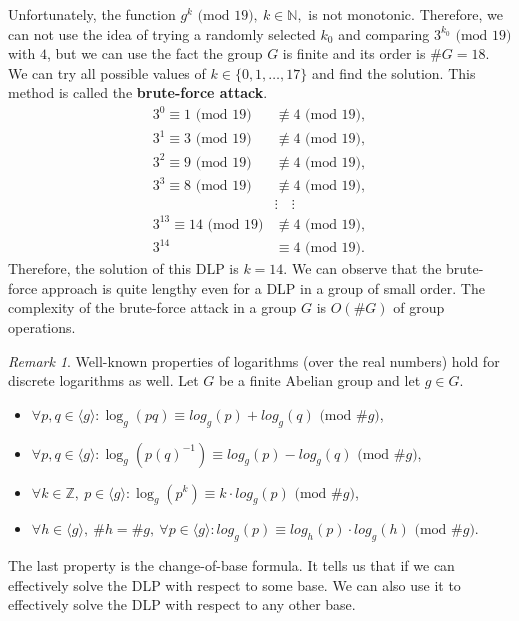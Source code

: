 \documentclass[thesis=M,english]{FITthesis}[2012/10/20]
\theoremstyle{remark}
\newtheorem*{RM}{Remark}
\theoremstyle{definition}
\begin{document}
\noindent Unfortunately, the function $g^k \text{ (mod 19)},\ k \in \mathbb{N},$ is not monotonic. Therefore, we can not use the idea of trying a randomly selected $k_0$ and comparing $3^{k_0} \text{ (mod 19)}$ with $4$, but we can use the fact the group $G$ is finite and its order is $\#G = 18$. We can try all possible values of $k \in \{0, 1, \ldots, 17\}$ and find the solution. This method is called the \textbf{brute-force attack}. 
\begin{align*}
3^0 \equiv 1 \text{ (mod 19)} &\not\equiv 4 \text{ (mod 19)}, \\
3^1 \equiv 3 \text{ (mod 19)} &\not\equiv 4 \text{ (mod 19)}, \\
3^2 \equiv 9 \text{ (mod 19)} &\not\equiv 4 \text{ (mod 19)}, \\
3^3 \equiv 8 \text{ (mod 19)} &\not\equiv 4 \text{ (mod 19)}, \\
&\vdots \quad \vdots \\
3^{13} \equiv 14 \text{ (mod 19)} &\not\equiv 4 \text{ (mod 19)}, \\
3^{14} &\equiv 4 \text{ (mod 19)}.
\end{align*}
Therefore, the solution of this DLP is $k = 14$. We can observe that the brute-force approach is quite lengthy even for a DLP in a group of small order. The complexity of the brute-force attack in a group $G$ is $O(\#G)$ of group operations.
\begin{RM}
Well-known properties of logarithms (over the real numbers) hold for discrete logarithms as well. Let $G$ be a finite Abelian group and let $g \in G$.
\begin{itemize}
\item $\forall p, q \in \langle g \rangle: \log_g(pq) \equiv log_g(p) + log_g(q) \text{ (mod $\#g$)}$,
\item $\forall p, q \in \langle g \rangle: \log_g(p(q)^{-1}) \equiv log_g(p) - log_g(q) \text{ (mod $\#g$)}$,
\item $\forall k \in \mathbb{Z},\ p \in \langle g \rangle: \log_g(p^k) \equiv k \cdot log_g(p) \text{ (mod $\#g$)}$,
\item $\forall h \in \langle g \rangle,\ \#h  = \#g,\ \forall p \in \langle g \rangle: log_g(p) \equiv log_h(p) \cdot log_g(h)  \text{ (mod $\#g$)}$.
\end{itemize}
The last property is the change-of-base formula. It tells us that if we can effectively solve the DLP with respect to some base. We can also use it to effectively solve the DLP with respect to any other base.
\end{RM}
\end{document}
